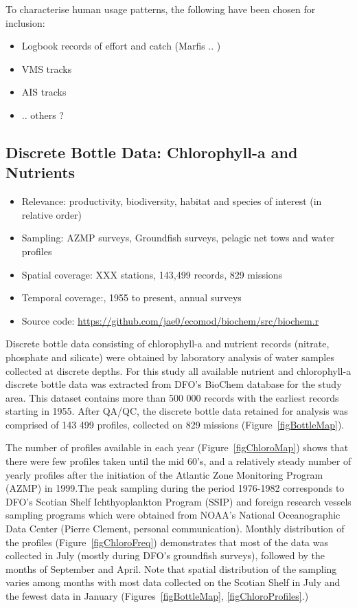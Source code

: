 \documentclass[letterpaper,portrait,11pt]{scrartcl}
\numberwithin{equation}{section}		%
\numberwithin{figure}{section}			%
\numberwithin{table}{section}				%
\begin{document}
To characterise human usage patterns, the following have been chosen for inclusion:

\begin{itemize}
	\item Logbook records of effort and catch (Marfis .. )
  \item VMS tracks
  \item AIS tracks
  \item ..  others ?
\end{itemize}

\subsection{Discrete Bottle Data: Chlorophyll-a and Nutrients}

\begin{itemize}
  \item Relevance:  productivity, biodiversity, habitat and species of interest (in relative order)
  \item Sampling:  AZMP surveys, Groundfish surveys, pelagic net tows and water profiles
  \item Spatial coverage: XXX stations, 143,499 records, 829 missions
  \item Temporal coverage:,  1955 to present, annual surveys
  \item Source code: \url{https://github.com/jae0/ecomod/biochem/src/biochem.r}
\end{itemize}

Discrete bottle data consisting of chlorophyll-a and nutrient records (nitrate, phosphate and silicate) were obtained by laboratory analysis of water samples collected at discrete depths. For this study all available nutrient and chlorophyll-a discrete bottle data was extracted from DFO's BioChem database for the study area. This dataset contains more than 500 000 records with the earliest records starting in 1955. After QA/QC, the discrete bottle data retained for analysis was comprised of 143 499 profiles, collected on 829 missions (Figure~\ref{figBottleMap}).


The number of profiles available in each year (Figure~\ref{figChloroMap}) shows that there were few profiles taken until the mid 60's, and a relatively steady number of yearly profiles after the initiation of the Atlantic Zone Monitoring Program (AZMP) in 1999.The peak sampling during the period 1976-1982 corresponds to DFO's Scotian Shelf Ichthyoplankton Program (SSIP) and foreign research vessels sampling programs which were obtained from NOAA's National Oceanographic Data Center (Pierre Clement, personal communication).  Monthly distribution of the profiles (Figure~\ref{figChloroFreq})  demonstrates that most of the data was collected in July (mostly during DFO's groundfish surveys), followed by the months of September and April. Note that spatial distribution of the sampling varies among months with most data collected on the Scotian Shelf in July and the fewest data in January (Figures~\ref{figBottleMap}, \ref{figChloroProfiles}.)
\end{document}
